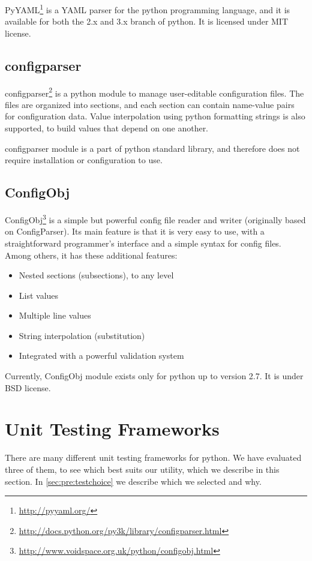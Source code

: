 PyYAML\footnote{\url{http://pyyaml.org/}} is a YAML parser for the python
programming language, and it is available for both the 2.x and 3.x branch of
python. It is licensed under MIT license.

\subsection{configparser}
configparser\footnote{\url{http://docs.python.org/py3k/library/configparser.html}}
is a python module to manage user-editable configuration files. The
files are organized into sections, and each section can contain name-value
pairs for configuration data. Value interpolation using python formatting
strings is also supported, to build values that depend on one another.

configparser module is a part of python standard library, and therefore does
not require installation or configuration to use.

\subsection{ConfigObj}
ConfigObj\footnote{\url{http://www.voidspace.org.uk/python/configobj.html}} is
a simple but powerful config file reader and writer (originally based on
ConfigParser). Its main feature is that it is very easy to use, with a
straightforward programmer's interface and a simple syntax for config files.
Among others, it has these additional features:
\begin{itemize}
	\item Nested sections (subsections), to any level
	\item List values
	\item Multiple line values
	\item String interpolation (substitution)
	\item Integrated with a powerful validation system
\end{itemize}

\noindent Currently, ConfigObj module exists only for python up to version
2.7. It is under BSD license.


\section{Unit Testing Frameworks}
\label{sec:pre:testing}
There are many different unit testing frameworks for python. We have evaluated
three of them, to see which best suits our utility, which we describe in this
section. In \autoref{sec:pre:testchoice} we describe which we selected and why.

